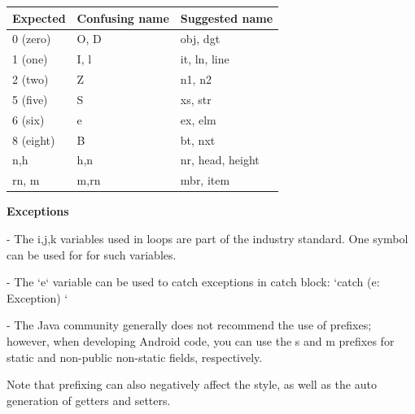 \begin{center}

\begin{tabular}{ |p{}|p{}|p{}| }

\hline

Expected&Confusing name&Suggested name\\

\hline

 0 (zero)      & O, D                     & obj, dgt         \\

 1 (one)       & I, l                     & it, ln, line     \\

 2 (two)       & Z                        & n1, n2           \\

 5 (five)      & S                        & xs, str          \\

 6 (six)       & e                        & ex, elm          \\

 8 (eight)     & B                        & bt, nxt          \\

 n,h           & h,n                      & nr, head, height \\

 rn, m         & m,rn                     & mbr, item        \\

\hline

\end{tabular}

\end{center}

\textbf{Exceptions}

- The i,j,k variables used in loops are part of the industry standard. One symbol can be used for for such variables.

- The `e` variable can be used to catch exceptions in catch block: `catch (e: Exception) {}`

- The Java community generally does not recommend the use of prefixes; however, when developing Android code, you can use the s and m prefixes for static and non-public non-static fields, respectively.

Note that prefixing can also negatively affect the style, as well as the auto generation of getters and setters.



